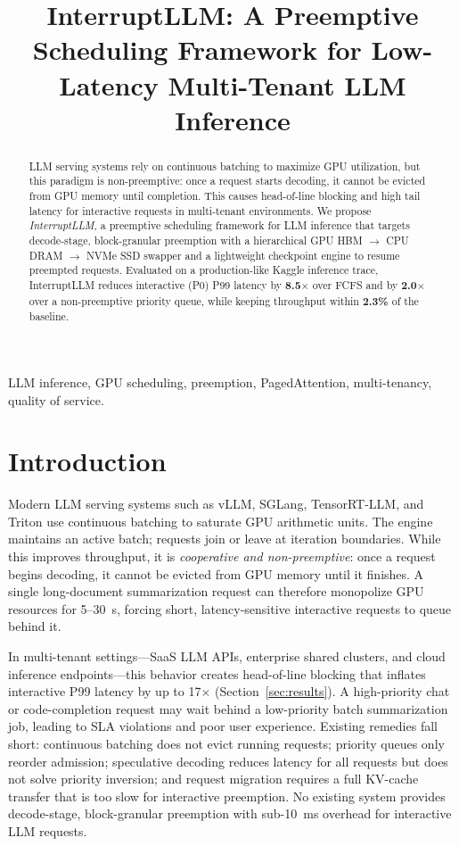\documentclass[conference]{IEEEtran}
\begin{document}
\title{InterruptLLM: A Preemptive Scheduling Framework for Low-Latency Multi-Tenant LLM Inference}

\author{
}

\maketitle

\begin{abstract}
LLM serving systems rely on continuous batching to maximize GPU utilization, but this paradigm is non-preemptive: once a request starts decoding, it cannot be evicted from GPU memory until completion. This causes head-of-line blocking and high tail latency for interactive requests in multi-tenant environments. We propose \emph{InterruptLLM}, a preemptive scheduling framework for LLM inference that targets decode-stage, block-granular preemption with a hierarchical GPU HBM $\rightarrow$ CPU DRAM $\rightarrow$ NVMe SSD swapper and a lightweight checkpoint engine to resume preempted requests. Evaluated on a production-like Kaggle inference trace, InterruptLLM reduces interactive (P0) P99 latency by \textbf{8.5$\times$} over FCFS and by \textbf{2.0$\times$} over a non-preemptive priority queue, while keeping throughput within \textbf{2.3\%} of the baseline.
\end{abstract}

\begin{IEEEkeywords}
LLM inference, GPU scheduling, preemption, PagedAttention, multi-tenancy, quality of service.
\end{IEEEkeywords}

\section{Introduction}\label{sec:intro}

Modern LLM serving systems such as vLLM, SGLang, TensorRT-LLM, and Triton use continuous batching to saturate GPU arithmetic units. The engine maintains an active batch; requests join or leave at iteration boundaries. While this improves throughput, it is \emph{cooperative and non-preemptive}: once a request begins decoding, it cannot be evicted from GPU memory until it finishes. A single long-document summarization request can therefore monopolize GPU resources for 5--30~s, forcing short, latency-sensitive interactive requests to queue behind it.

In multi-tenant settings---SaaS LLM APIs, enterprise shared clusters, and cloud inference endpoints---this behavior creates head-of-line blocking that inflates interactive P99 latency by up to 17$\times$ (Section~\ref{sec:results}). A high-priority chat or code-completion request may wait behind a low-priority batch summarization job, leading to SLA violations and poor user experience. Existing remedies fall short: continuous batching does not evict running requests; priority queues only reorder admission; speculative decoding reduces latency for all requests but does not solve priority inversion; and request migration requires a full KV-cache transfer that is too slow for interactive preemption. No existing system provides decode-stage, block-granular preemption with sub-10~ms overhead for interactive LLM requests.
\end{document}
